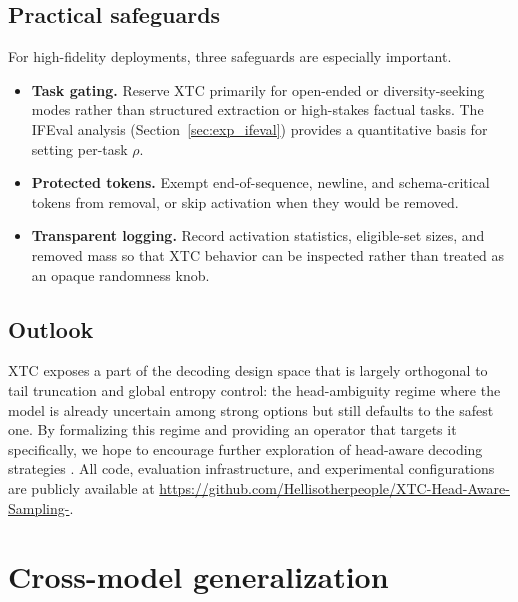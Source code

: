 \documentclass{article}
\newcommand{\xtc}{\textsc{XTC}}
\begin{document}
\subsection{Practical safeguards}

For high-fidelity deployments, three safeguards are especially important.
\begin{itemize}[leftmargin=1.25em]
\item \textbf{Task gating.} Reserve \xtc{} primarily for open-ended or diversity-seeking modes rather than structured extraction or high-stakes factual tasks. The IFEval analysis (Section~\ref{sec:exp_ifeval}) provides a quantitative basis for setting per-task $\rho$.
\item \textbf{Protected tokens.} Exempt end-of-sequence, newline, and schema-critical tokens from removal, or skip activation when they would be removed.
\item \textbf{Transparent logging.} Record activation statistics, eligible-set sizes, and removed mass so that \xtc{} behavior can be inspected rather than treated as an opaque randomness knob.
\end{itemize}

\subsection{Outlook}
\xtc{} exposes a part of the decoding design space that is largely orthogonal to tail truncation and global entropy control: the head-ambiguity regime where the model is already uncertain among strong options but still defaults to the safest one.
By formalizing this regime and providing an operator that targets it specifically, we hope to encourage further exploration of head-aware decoding strategies \citep{minaee2024large, zhao2023survey}.
All code, evaluation infrastructure, and experimental configurations are publicly available at \url{https://github.com/Hellisotherpeople/XTC-Head-Aware-Sampling-}.
\FloatBarrier

\section{Cross-model generalization}
\label{app:crossmodel}
\end{document}
